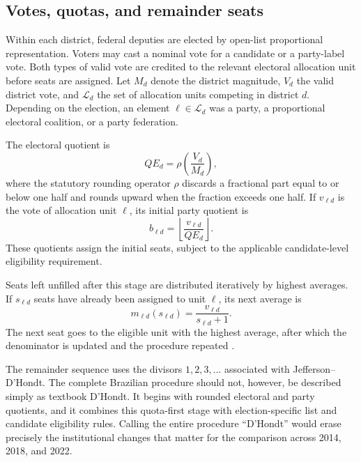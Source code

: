 \documentclass[11pt]{article}
\begin{document}
\subsection{Votes, quotas, and remainder seats}

Within each district, federal deputies are elected by open-list proportional
representation. Voters may cast a nominal vote for a candidate or a
party-label vote. Both types of valid vote are credited to the relevant
electoral allocation unit before seats are assigned. Let \(M_d\) denote the
district magnitude, \(V_d\) the valid district vote, and
\(\mathcal{L}_d\) the set of allocation units competing in district \(d\).
Depending on the election, an element \(\ell\in\mathcal{L}_d\) was a party,
a proportional electoral coalition, or a party federation.

The electoral quotient is
\[
QE_d=\rho\left(\frac{V_d}{M_d}\right),
\]
where the statutory rounding operator \(\rho\) discards a fractional part
equal to or below one half and rounds upward when the fraction exceeds one
half. If \(v_{\ell d}\) is the vote of allocation unit \(\ell\), its initial
party quotient is
\[
b_{\ell d}
=
\left\lfloor
\frac{v_{\ell d}}{QE_d}
\right\rfloor .
\]
These quotients assign the initial seats, subject to the applicable
candidate-level eligibility requirement.

Seats left unfilled after this stage are distributed iteratively by highest
averages. If \(s_{\ell d}\) seats have already been assigned to unit \(\ell\),
its next average is
\[
m_{\ell d}(s_{\ell d})
=
\frac{v_{\ell d}}{s_{\ell d}+1}.
\]
The next seat goes to the eligible unit with the highest average, after which
the denominator is updated and the procedure repeated
\parencite[arts.~106--109]{codigoEleitoral1965}.

The remainder sequence uses the divisors \(1,2,3,\ldots\) associated with
Jefferson--D'Hondt. The complete Brazilian procedure should not, however,
be described simply as textbook D'Hondt. It begins with rounded electoral
and party quotients, and it combines this quota-first stage with
election-specific list and candidate eligibility rules. Calling the entire
procedure ``D'Hondt'' would erase precisely the institutional changes that
matter for the comparison across 2014, 2018, and 2022.
\end{document}
